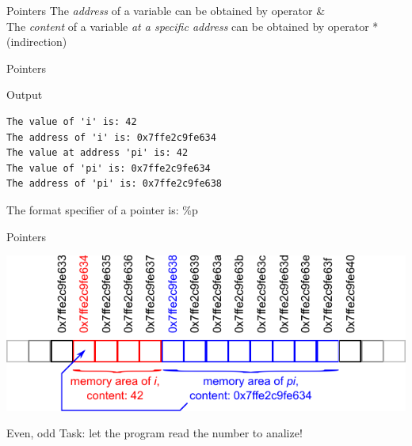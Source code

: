 \documentclass[usenames,dvipsnames,aspectratio=169]{beamer}
\newcommand{\kiemel}[1]{{\color{kiemelesszin}#1}}
\begin{document}
\begin{frame}{Pointers}
  The \emph{address} of a variable can be obtained by operator \kiemel{\&}\\
  The \emph{content} of a variable \emph{at a specific address} can be obtained by operator \kiemel{*} (indirection)\\
  \begin{exampleblock}{}
    \vspace{-.3cm}
    \footnotesize
    
    \vspace{-.3cm}
  \end{exampleblock}
\end{frame}

\begin{frame}[fragile]{Pointers}
  \begin{block}{Output}
    \begin{verbatim}
The value of 'i' is: 42
The address of 'i' is: 0x7ffe2c9fe634
The value at address 'pi' is: 42
The value of 'pi' is: 0x7ffe2c9fe634
The address of 'pi' is: 0x7ffe2c9fe638
\end{verbatim}
  \end{block}
  The format specifier of a pointer is: \kiemel{\%p}\\
  \begin{exampleblock}{}
    \footnotesize
    
  \end{exampleblock}
\end{frame}

\begin{frame}{Pointers}
  \begin{center}
    \includegraphics[scale=1.25]{pointer.pdf}
  \end{center}
\end{frame}

\begin{frame}{Even, odd}
  Task: let the program read the number to analize!
  \begin{exampleblock}{}
    \footnotesize
    
  \end{exampleblock}
\end{frame}
\end{document}

